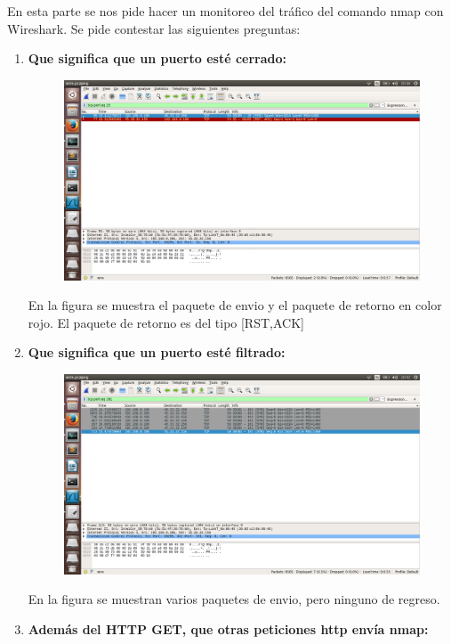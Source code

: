 \documentclass[a4paper,12pt]{article}
\begin{document}
En esta parte se nos pide hacer un monitoreo del tráfico del comando nmap con Wireshark. Se pide contestar las siguientes preguntas:

\begin{enumerate}
 \item \textbf{Que significa que un puerto esté cerrado:} \\
 \begin{figure}[H]
  \centering
  \includegraphics[scale = 0.3]{2.png}
 \end{figure}
 En la figura se muestra el paquete de envio y el paquete de retorno en color rojo. El paquete de retorno es del tipo
 [RST,ACK]
 \item \textbf{Que significa que un puerto esté filtrado:} \\
 \begin{figure}[H]
  \centering
  \includegraphics[scale = 0.3]{3.png}
 \end{figure}
 En la figura se muestran varios paquetes de envio, pero ninguno de regreso.
 \item \textbf{Además del HTTP GET, que otras peticiones http envía nmap:} \\

\end{enumerate}
\end{document}
